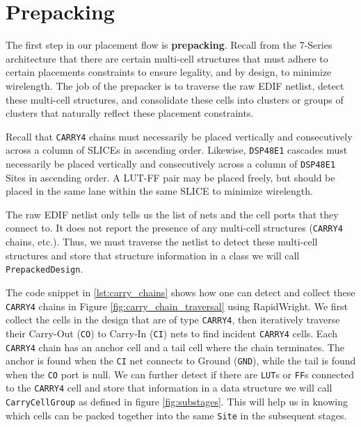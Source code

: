


\section{Prepacking}
\label{sec:prepacking}


The first step in our placement flow is \textbf{prepacking}. 
Recall from the 7-Series architecture that there are certain multi-cell structures that must adhere to certain placements constraints to ensure legality, and by design, to minimize wirelength. 
The job of the prepacker is to traverse the raw EDIF netlist, detect these multi-cell structures, and consolidate these cells into clusters or groups of clusters that naturally reflect these placement constraints. 

Recall that \texttt{CARRY4} chains must necessarily be placed vertically and consecutively across a column of SLICEs in ascending order. 
Likewise, \texttt{DSP48E1} cascades must necessarily be placed vertically and consecutively across a column of \texttt{DSP48E1} Sites in ascending order. 
A LUT-FF pair may be placed freely, but should be placed in the same lane within the same SLICE to minimize wirelength.

The raw EDIF netlist only tells us the list of nets and the cell ports that they connect to. 
It does not report the presence of any multi-cell structures (\texttt{CARRY4} chains, etc.). 
Thus, we must traverse the netlist to detect these multi-cell structures and store that structure information in a class we will call \texttt{PrepackedDesign}.

The code snippet in \ref{lst:carry_chains} shows how one can detect and collect these \texttt{CARRY4} chains in Figure \ref{fig:carry_chain_traversal} using RapidWright. 
We first collect the cells in the design that are of type \texttt{CARRY4}, then iteratively traverse their Carry-Out (\texttt{CO}) to Carry-In (\texttt{CI}) nets to find incident \texttt{CARRY4} cells.
Each \texttt{CARRY4} chain has an anchor cell and a tail cell where the chain terminates.
The anchor is found when the \texttt{CI} net connects to Ground (\texttt{GND}), while the tail is found when the \texttt{CO} port is null. 
We can further detect if there are \texttt{LUT}s or \texttt{FF}s connected to the \texttt{CARRY4} cell and store that information in a data structure we will call \texttt{CarryCellGroup} as defined in figure \ref{fig:substages}.
This will help us in knowing which cells can be packed together into the same \texttt{Site} in the subsequent stages. 


